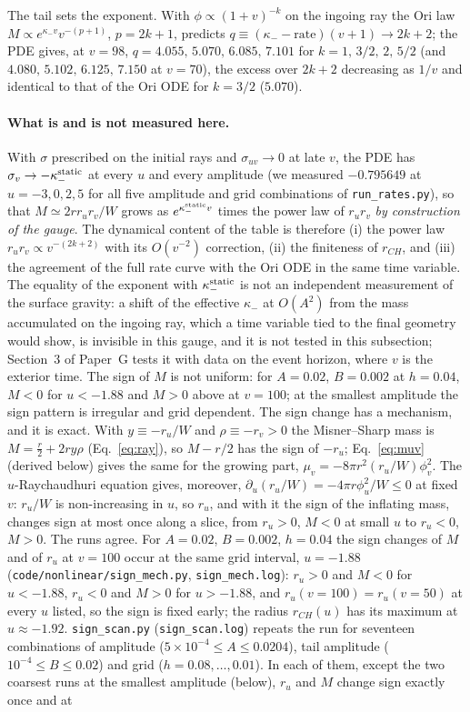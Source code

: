 \documentclass[11pt]{article}
\newcommand{\Gehdatan}{3}\newcommand{\Gkernelnum}{4}\newcommand{\Gshelln}{4.7}\newcommand{\Grayn}{5}
\begin{document}
The tail sets the exponent. With $\phi\propto(1+v)^{-k}$ on the ingoing ray the Ori law $M\propto e^{\kappa_-v}v^{-(p+1)}$, $p=2k+1$, predicts $q\equiv(\kappa_--\text{rate})(v+1)\to2k+2$; the PDE gives, at $v=98$, $q=4.055,\,5.070,\,6.085,\,7.101$ for $k=1,\,3/2,\,2,\,5/2$ (and $4.080,\,5.102,\,6.125,\,7.150$ at $v=70$), the excess over $2k+2$ decreasing as $1/v$ and identical to that of the Ori ODE for $k=3/2$ ($5.070$).

\paragraph{What is and is not measured here.} With $\sigma$ prescribed on the initial rays and $\sigma_{uv}\to0$ at late $v$, the PDE has $\sigma_v\to-\kappa_-^{\rm static}$ at every $u$ and every amplitude (we measured $-0.795649$ at $u=-3,0,2,5$ for all five amplitude and grid combinations of \texttt{run\_rates.py}), so that $M\simeq2rr_ur_v/W$ grows as $e^{\kappa_-^{\rm static}v}$ times the power law of $r_ur_v$ \emph{by construction of the gauge}. The dynamical content of the table is therefore (i) the power law $r_ur_v\propto v^{-(2k+2)}$ with its $O(v^{-2})$ correction, (ii) the finiteness of $r_{CH}$, and (iii) the agreement of the full rate curve with the Ori ODE in the same time variable. The equality of the exponent with $\kappa_-^{\rm static}$ is not an independent measurement of the surface gravity: a shift of the effective $\kappa_-$ at $O(A^2)$ from the mass accumulated on the ingoing ray, which a time variable tied to the final geometry would show, is invisible in this gauge, and it is not tested in this subsection; Section~\Gehdatan{} of Paper~G tests it with data on the event horizon, where $v$ is the exterior time. The sign of $M$ is not uniform: for $A=0.02$, $B=0.002$ at $h=0.04$, $M<0$ for $u<-1.88$ and $M>0$ above at $v=100$; at the smallest amplitude the sign pattern is irregular and grid dependent. The sign change has a mechanism, and it is exact. With $y\equiv-r_u/W$ and $\rho\equiv-r_v>0$ the Misner--Sharp mass is $M=\tfrac r2+2ry\rho$ (Eq.~\eqref{eq:ray}), so $M-r/2$ has the sign of $-r_u$; Eq.~\eqref{eq:muv} (derived below) gives the same for the growing part, $\mu_v=-8\pi r^2(r_u/W)\phi_v^2$. The $u$-Raychaudhuri equation gives, moreover, $\partial_u(r_u/W)=-4\pi r\phi_u^2/W\le0$ at fixed $v$: $r_u/W$ is non-increasing in $u$, so $r_u$, and with it the sign of the inflating mass, changes sign at most once along a slice, from $r_u>0$, $M<0$ at small $u$ to $r_u<0$, $M>0$. The runs agree. For $A=0.02$, $B=0.002$, $h=0.04$ the sign changes of $M$ and of $r_u$ at $v=100$ occur at the same grid interval, $u=-1.88$ (\texttt{code/nonlinear/sign\_mech.py}, \texttt{sign\_mech.log}): $r_u>0$ and $M<0$ for $u<-1.88$, $r_u<0$ and $M>0$ for $u>-1.88$, and $r_u(v=100)=r_u(v=50)$ at every $u$ listed, so the sign is fixed early; the radius $r_{CH}(u)$ has its maximum at $u\approx-1.92$. \texttt{sign\_scan.py} (\texttt{sign\_scan.log}) repeats the run for seventeen combinations of amplitude ($5\times10^{-4}\le A\le0.0204$), tail amplitude ($10^{-4}\le B\le0.02$) and grid ($h=0.08,\dots,0.01$). In each of them, except the two coarsest runs at the smallest amplitude (below), $r_u$ and $M$ change sign exactly once and at 
\end{document}
